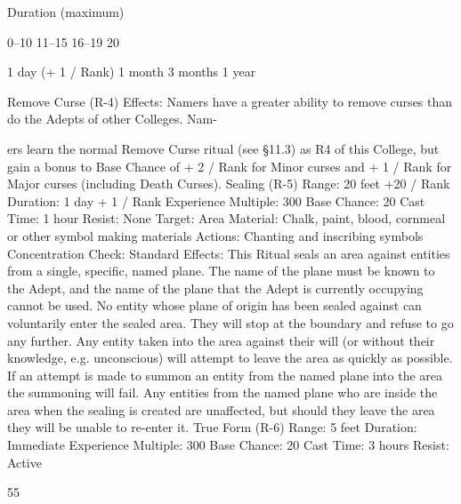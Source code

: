\documentclass[a4paper]{article}
\begin{document}
\begin{multicols}{3}
Duration (maximum)

0–10
11–15
16–19
20

1 day (+ 1 / Rank)
1 month
3 months
1 year

Remove Curse (R-4)
Effects: Namers have a greater ability to remove
curses than do the Adepts of other Colleges. Nam-

ers learn the normal Remove Curse ritual (see
§11.3) as R4 of this College, but gain a bonus to
Base Chance of + 2 / Rank for Minor curses and +
1 / Rank for Major curses (including Death
Curses).
Sealing (R-5)
Range: 20 feet +20 / Rank
Duration: 1 day + 1 / Rank
Experience Multiple: 300
Base Chance: 20%
Cast Time: 1 hour
Resist: None
Target: Area
Material: Chalk, paint, blood, cornmeal or other
symbol making materials
Actions: Chanting and inscribing symbols
Concentration Check: Standard
Effects: This Ritual seals an area against entities
from a single, specific, named plane. The name of
the plane must be known to the Adept, and the
name of the plane that the Adept is currently occupying cannot be used. No entity whose plane of
origin has been sealed against can voluntarily enter
the sealed area. They will stop at the boundary and
refuse to go any further. Any entity taken into the
area against their will (or without their knowledge,
e.g. unconscious) will attempt to leave the area as
quickly as possible. If an attempt is made to summon an entity from the named plane into the area
the summoning will fail. Any entities from the
named plane who are inside the area when the
sealing is created are unaffected, but should they
leave the area they will be unable to re-enter it.
True Form (R-6)
Range: 5 feet
Duration: Immediate
Experience Multiple: 300
Base Chance: 20%
Cast Time: 3 hours
Resist: Active

55


\end{multicols}
\end{document}
